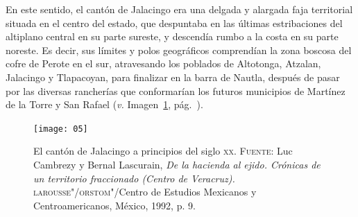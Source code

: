 \documentclass[14pt,twoside,final]{extbook} %
\begin{document}
En este sentido, el cantón de Jalacingo era una delgada y alargada faja territorial situada en el centro del estado, que despuntaba en las últimas estribaciones del altiplano central en su parte sureste, y descendía rumbo a la costa en su parte noreste. Es decir, sus límites y polos geográficos comprendían la zona boscosa del cofre de Perote en el sur, atravesando los poblados de Altotonga, Atzalan, Jalacingo y Tlapacoyan, para finalizar en la barra de Nautla, después de pasar por las diversas rancherías que conformarían los futuros municipios de Martínez de la Torre y San Rafael (\emph{v.} Imagen~\ref{fig:jalacingo-principios-xx}, pág.~\pageref{fig:jalacingo-principios-xx}).
\begin{figure}
\texttt{[image: 05]}
\caption[El cantón de Jalacingo a principios del siglo \textsc{xx}]{El cantón de Jalacingo a principios del siglo \textsc{xx}. \textsc{Fuente:} Luc Cambrezy y Bernal Lascurain, \emph{De la hacienda al ejido. Crónicas de un territorio fraccionado (Centro de Veracruz).} \textsc{larousse"/orstom}"/Centro de Estudios Mexicanos y Centroamericanos, México, 1992, p. 9.}
\label{fig:jalacingo-principios-xx}
\end{figure}
\end{document}
